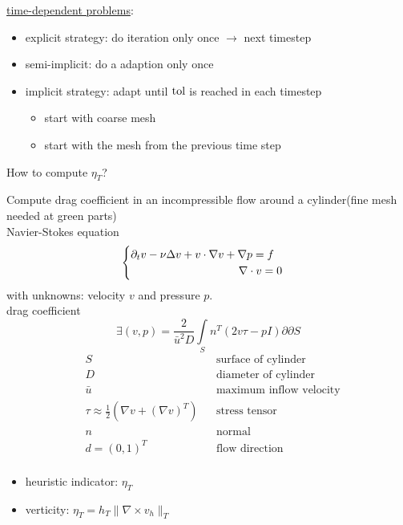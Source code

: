 \underline{time-dependent problems}:\nl
\begin{itemize}
	\item explicit strategy: do iteration only once $\to$ next timestep
	\item semi-implicit: do a adaption only once
	\item implicit strategy: adapt until $\text{tol}$ is reached in each timestep
	\begin{itemize}
		\item start with coarse mesh
		\item start with the mesh from the previous time step
	\end{itemize}
\end{itemize}
How to compute $\eta_T$?\vspace{1cm}
\begin{example}
	Compute drag coefficient in an incompressible flow around a cylinder(fine mesh needed at green parts)\\
	Navier-Stokes equation
	\begin{align*}
	\begin{cases}
	\partial_t v - \nu \laplace v + v \cdot \nabla v + \nabla p = f\\
	\hspace{3.4cm}\nabla \cdot v = 0
	\end{cases}
	\end{align*}
	with unknowns: velocity $v$ and pressure $p$.\\
	drag coefficient 
	\begin{equation*}
		\exists (v,p) = \frac{2}{\bar{u}^2D}\int \limits_S n^T \left(2v \tau -p I\right) \partial \partial S
	\end{equation*}
	\begin{align*}
		&S && \text{surface of cylinder}\\
		&D && \text{diameter of cylinder}\\
		&\bar{u} && \text{maximum inflow velocity}\\
		&\tau \approx \frac{1}{2}(\nabla v + (\nabla v )^T) && \text{stress tensor}\\
		&n && \text{normal}\\
		&d=(0,1)^T && \text{flow direction}\\
	\end{align*}
	\begin{itemize}
		\item heuristic indicator: $\eta_T$
		\item verticity: $\eta_T = h_T \|\nabla \times v_h\|_T$

\end{itemize}
\end{example}
